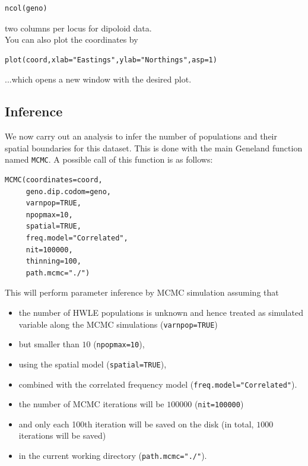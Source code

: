 \documentclass[a4paper,10pt]{article}
\begin{document}
\begin{verbatim}
ncol(geno)
\end{verbatim}



two columns per locus for dipoloid data.\\


You can also plot the coordinates by 

\begin{verbatim}
plot(coord,xlab="Eastings",ylab="Northings",asp=1)
\end{verbatim}



...which opens a new window with the desired plot.


\subsection{Inference}\label{sec:example_MCMC}

We now carry out an analysis to infer the number of populations and their spatial boundaries for this dataset.
This is done with the main {\sc Geneland} function named {\tt MCMC}. 
A possible call of this function is as follows:

\begin{verbatim}
MCMC(coordinates=coord,
     geno.dip.codom=geno,
     varnpop=TRUE, 
     npopmax=10,
     spatial=TRUE,
     freq.model="Correlated",
     nit=100000,
     thinning=100,
     path.mcmc="./")
\end{verbatim}



This will perform parameter inference by MCMC simulation assuming 
that 
\begin{itemize}
\item the number of HWLE populations is unknown and hence treated as simulated 
variable along the MCMC simulations (\texttt{varnpop=TRUE}) 
\item but smaller than $10$ (\texttt{npopmax=10}), 
\item using the spatial model (\texttt{spatial=TRUE}), 
\item combined with 
the correlated frequency model (\texttt{freq.model="Correlated"}). 
\item the number of MCMC iterations will be $100000$ (\texttt{nit=100000}) 
\item and only each 100th iteration will be saved on the disk (in total, $1000$ iterations will be saved)
\item in the current working directory (\texttt{path.mcmc="./"}).
\end{itemize}
\end{document}
